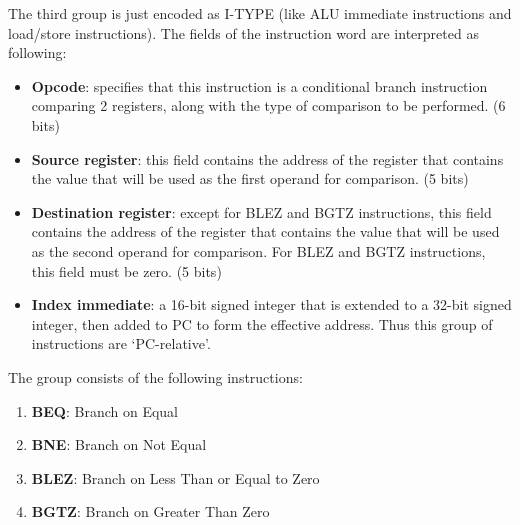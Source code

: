 \documentclass[oneside]{book}
\begin{document}
\begin{itemize}
The third group is just encoded as I-TYPE (like ALU immediate
instructions and load/store instructions). The fields of the instruction
word are interpreted as following:

\begin{itemize}

\item \textbf{Opcode}: specifies that this instruction is a conditional
                       branch instruction comparing 2 registers, along
                       with the type of comparison to be performed. (6 bits)

\item \textbf{Source register}: this field contains the address of the
                                register that contains the value
                                that will be used as the first operand
                                for comparison. (5 bits)

\item \textbf{Destination register}: except for BLEZ and BGTZ instructions,
                                     this field contains the address of the
                                     register that contains the value that
                                     will be used as the second operand
                                     for comparison. For BLEZ and BGTZ
                                     instructions, this field must be
                                     zero. (5 bits)

\item \textbf{Index immediate}: a 16-bit signed integer that is extended
                                to a 32-bit signed integer, then added
                                to PC to form the effective address. Thus
                                this group of instructions are `PC-relative'.

\end{itemize}

The group consists of the following instructions:

\begin{enumerate}

\item \textbf{BEQ}:  Branch on Equal
\item \textbf{BNE}:  Branch on Not Equal
\item \textbf{BLEZ}: Branch on Less Than or Equal to Zero
\item \textbf{BGTZ}: Branch on Greater Than Zero

\end{enumerate}


\end{itemize}
\end{document}
